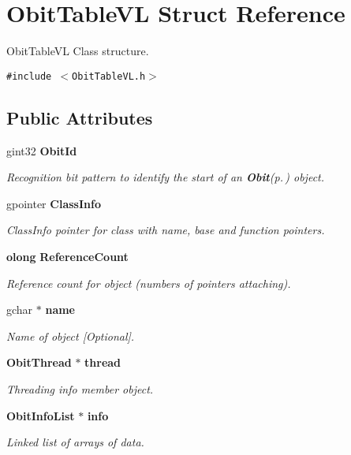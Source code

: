 \section{Obit\-Table\-VL Struct Reference}
\label{structObitTableVL}
Obit\-Table\-VL Class structure.  


{\tt \#include $<$Obit\-Table\-VL.h$>$}

\subsection*{Public Attributes}
\begin{CompactItemize}
\item 
gint32 {\bf Obit\-Id}
\begin{CompactList}\small\item\em Recognition bit pattern to identify the start of an {\bf Obit}{\rm (p.\,\pageref{structObit})} object. \item\end{CompactList}\item 
gpointer {\bf Class\-Info}
\begin{CompactList}\small\item\em Class\-Info pointer for class with name, base and function pointers. \item\end{CompactList}\item 
{\bf olong} {\bf Reference\-Count}
\begin{CompactList}\small\item\em Reference count for object (numbers of pointers attaching). \item\end{CompactList}\item 
gchar $\ast$ {\bf name}
\begin{CompactList}\small\item\em Name of object [Optional]. \item\end{CompactList}\item 
{\bf Obit\-Thread} $\ast$ {\bf thread}
\begin{CompactList}\small\item\em Threading info member object. \item\end{CompactList}\item 
{\bf Obit\-Info\-List} $\ast$ {\bf info}
\begin{CompactList}\small\item\em Linked list of arrays of data. \item\end{CompactList}\item 

\end{CompactItemize}
